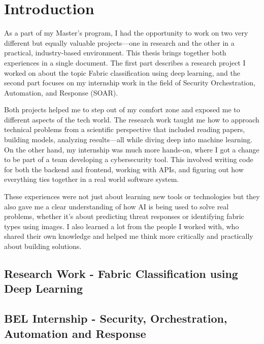 \chapter{Introduction}

As a part of my Master’s program, I had the opportunity to work on two very different but equally valuable projects—one in research and the other in a practical, industry-based environment. This thesis brings together both experiences in a single document. The first part describes a research project I worked on about the topic Fabric classification using deep learning, and the second part focuses on my internship work in the field of Security Orchestration, Automation, and Response (SOAR).

Both projects helped me to step out of my comfort zone and exposed me to different aspects of the tech world. The research work taught me how to approach technical problems from a scientific perspective that included reading papers, building models, analyzing results—all while diving deep into machine learning. On the other hand, my internship was much more hands-on, where I got a change to be part of a team developing a cybersecurity tool. This involved writing code for both the backend and frontend, working with APIs, and figuring out how everything ties together in a real world software system.

These experiences were not just about learning new tools or technologies but they also gave me a clear understanding of how AI is being used to solve real problems, whether it’s about predicting threat responses or identifying fabric types using images. I also learned a lot from the people I worked with, who shared their own knowledge and helped me think more critically and practically about building solutions.


\section{Research Work - Fabric Classification using Deep Learning}

\section{BEL Internship - Security, Orchestration, Automation and Response}
